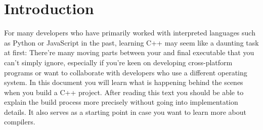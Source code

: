\section{Introduction}

For many developers who have primarily worked with interpreted languages such as
Python or JavaScript in the past, learning C++ may seem like a daunting task at
first: There're many moving parts between your  and final
executable that you can't simply ignore, especially if you're keen on developing
cross-platform programs or want to collaborate with developers who use a different
operating system. In this document you will learn what is happening behind the scenes
when you build a C++ project. After reading this text you should be able to explain
the build process more precisely without going into implementation details. It also
serves as a starting point in case you want to learn more about compilers. 
